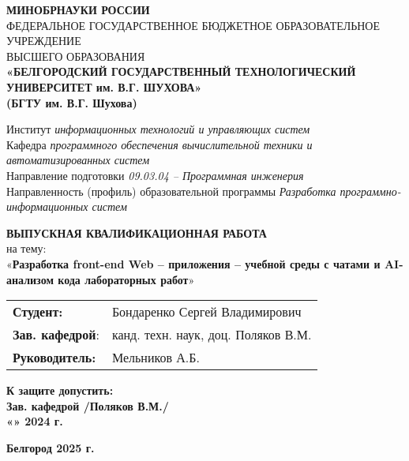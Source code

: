 \begin{titlepage}
    \centering
    {\small \textbf{МИНОБРНАУКИ РОССИИ}}\\
    {\small ФЕДЕРАЛЬНОЕ ГОСУДАРСТВЕННОЕ БЮДЖЕТНОЕ ОБРАЗОВАТЕЛЬНОЕ УЧРЕЖДЕНИЕ}\\
    {\small ВЫСШЕГО ОБРАЗОВАНИЯ}\\
    \textbf{
    «БЕЛГОРОДСКИЙ ГОСУДАРСТВЕННЫЙ ТЕХНОЛОГИЧЕСКИЙ \\
    УНИВЕРСИТЕТ им. В.Г. ШУХОВА» \\
    (БГТУ им. В.Г. Шухова) \\
    }
    
    \vfill %
    
    \raggedright
    Институт \textit{информационных технологий и управляющих систем}\\
    Кафедра \textit{программного обеспечения вычислительной техники и автоматизированных систем}\\
    Направление подготовки \textit{09.03.04 – Программная инженерия}\\
    Направленность (профиль) образовательной программы \textit{Разработка программно-информационных систем}
    
    \centering
    \vfill
    
    \textbf{ВЫПУСКНАЯ КВАЛИФИКАЦИОННАЯ РАБОТА}\\
    {\large на тему:\\[1ex]
    «\textbf{Разработка front-end Web – приложения – учебной среды с чатами и AI-анализом кода лабораторных работ}»}
    
    \vfill %
    
    \raggedright
    \begin{tabular}{@{} l l @{}}
        \textbf{Студент:}       & Бондаренко Сергей Владимирович \\
        \textbf{Зав. кафедрой}: & канд. техн. наук, доц. Поляков В.М. \\
        \textbf{Руководитель:}  & Мельников А.Б.
    \end{tabular}
    
    \vfill
    
    \centering
    \begin{minipage}{0.7\textwidth}
        \textbf{К защите допустить:\\
        Зав. кафедрой \underline{\hspace{4cm}} /Поляков В.М./\\
        «\underline{\hspace{1cm}}» \underline{\hspace{2cm}} 2024 г.}
    \end{minipage}
    
    \vfill
    
    \textbf{Белгород 2025 г.}
    
\end{titlepage}

